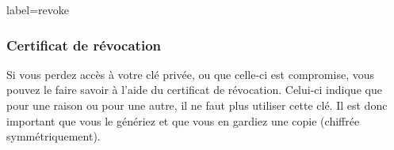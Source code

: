 \documentclass{beamer}
\begin{document}
        \begin{frame}{label=revoke}
            \frametitle{Certificat de révocation}
            Si vous perdez accès à votre clé privée, ou que celle-ci est compromise, vous pouvez le faire savoir à l'aide du certificat de révocation.
            Celui-ci indique que pour une raison ou pour une autre, il ne faut plus utiliser cette clé. Il est donc important que vous le génériez et que vous en gardiez une copie (chiffrée symmétriquement).
        \end{frame}
        \appendix
        \begin{frame}
            {}
            
        \end{frame}
\end{document}

